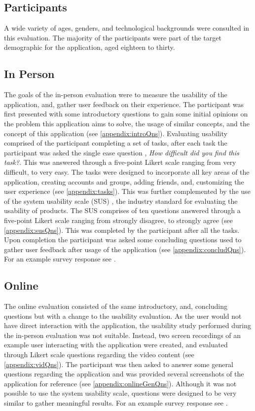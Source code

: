 \subsection*{Participants}
A wide variety of ages, genders, and technological backgrounds were consulted in this evaluation. The majority of the participants were part of the target demographic for the application, aged eighteen to thirty. 

\subsection{In Person}
The goals of the in-person evaluation were to measure the usability of the application, and, gather user feedback on their experience. The participant was first presented with some introductory questions to gain some initial opinions on the problem this application aims to solve, the usage of similar concepts, and the concept of this application (see \ref{appendix:introQns}).
Evaluating usability comprised of the participant completing a set of tasks, after each task the participant was asked the single ease question \cite{seq}, \textit{How difficult did you find this task?}. This was answered through a five-point Likert scale ranging from very difficult, to very easy. The tasks were designed to incorporate all key areas of the application, creating accounts and groups, adding friends, and, customizing the user experience (see \ref{appendix:tasks}). This was further complemented by the use of the system usability scale (SUS) \cite{sus}, the industry standard for evaluating the usability of products. The SUS comprises of ten questions answered through a five-point Likert scale ranging from strongly disagree, to strongly agree (see \ref{appendix:susQns}). This was completed by the participant after all the tasks. Upon completion the participant was asked some concluding questions used to gather user feedback after usage of the application (see \ref{appendix:concludQns}). 
For an example survey response see \cite{evalRespWApp}.

\subsection{Online}
The online evaluation consisted of the same introductory, and, concluding questions but with a change to the usability evaluation. As the user would not have direct interaction with the application, the usability study performed during the in-person evaluation was not suitable. Instead, two screen recordings of an example user interacting with the application were created, and evaluated through Likert scale questions regarding the video content (see \ref{appendix:vidQns}). The participant was then asked to answer some general questions regarding the application and was provided several screenshots of the application for reference (see \ref{appendix:onlineGenQns}). Although it was not possible to use the system usability scale, questions were designed to be very similar to gather meaningful results. For an example survey response see \cite{evalRespNoApp}. 

